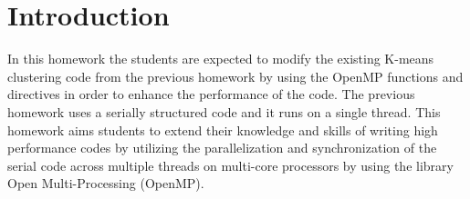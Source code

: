 \section{Introduction}
In this homework the students are expected to modify the existing K-means clustering code from the previous homework by using the OpenMP functions and directives in order to enhance the performance of the code. The previous homework uses a serially structured code and it runs on a single thread. This homework aims students to extend their knowledge and skills of writing high performance codes by utilizing the parallelization and synchronization of the serial code across multiple threads on multi-core processors by using the library Open Multi-Processing (OpenMP). 